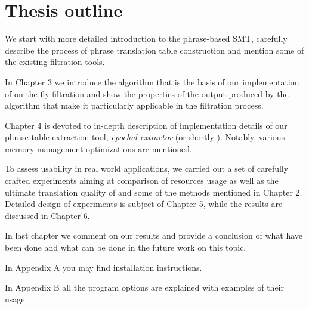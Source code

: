 \section{Thesis outline}

We start with more detailed introduction to the phrase-based SMT,
carefully describe the process of phrase translation table construction
and mention some of the existing filtration tools.

In Chapter 3 we introduce the algorithm that is the basis of our implementation
of on-the-fly filtration and show the properties of the output produced
by the algorithm that make it particularly applicable in the filtration process.

Chapter 4 is devoted to in-depth description of implementation details of our
phrase table extraction tool, \emph{epochal extractor} (or shortly \eppex{}).
Notably, various memory-management optimizations are mentioned.

To assess \eppex{} usability in real world applications, we carried out a set
of carefully crafted experiments aiming at comparison of resources usage as well as
the ultimate translation quality of \eppex{} and some of the methods mentioned
in Chapter 2.
Detailed design of experiments is subject of Chapter 5,
while the results are discussed in Chapter 6.

In last chapter we comment on our results and provide a conclusion of
what have been done and what can be done in the future work on this topic.

In Appendix A you may find \eppex{} installation instructions.

In Appendix B all the program options are explained with examples of their usage.
